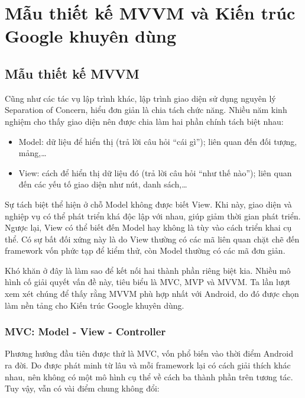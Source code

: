 \documentclass[../../thesis]{subfiles}
\begin{document}

\section{Mẫu thiết kế MVVM và Kiến trúc Google khuyên dùng}

\subsection{Mẫu thiết kế MVVM}

Cũng như các tác vụ lập trình khác, lập trình giao diện sử dụng nguyên lý
Separation of Concern, hiểu đơn giản là chia tách chức năng. Nhiều năm kinh
nghiệm cho thấy giao diện nên được chia làm hai phần chính tách biệt nhau:

\begin{itemize}
    \item
        Model: dữ liệu để hiển thị (trả lời câu hỏi ``cái gì''); liên quan đến
        đối tượng, mảng,\ldots
    \item
        View: cách để hiển thị dữ liệu đó (trả lời câu hỏi ``như thế nào'');
        liên quan đến các yếu tố giao diện như nút, danh sách,\ldots
\end{itemize}

Sự tách biệt thể hiện ở chỗ Model không được biết View. Khi này, giao diện và
nghiệp vụ có thể phát triển khá độc lập với nhau, giúp giảm thời gian phát
triển. Ngược lại, View có thể biết đến Model hay không là tùy vào cách triển
khai cụ thể. Có sự bất đối xứng này là do View thường có các mã liên quan chặt
chẽ đến framework vốn phức tạp để kiểm thử, còn Model thường có các mã đơn giản.

Khó khăn ở đây là làm sao để kết nối hai thành phần riêng biệt kia. Nhiều mô
hình cố giải quyết vấn đề này, tiêu biểu là MVC, MVP và MVVM. Ta lần lượt xem
xét chúng để thấy rằng MVVM phù hợp nhất với Android, do đó được chọn làm nền
tảng cho Kiến trúc Google khuyên dùng.

\subsubsection{MVC: Model - View - Controller}

Phương hướng đầu tiên được thử là MVC, vốn phổ biến vào thời điểm Android ra
đời. Do được phát minh từ lâu và mỗi framework lại có cách giải thích khác nhau,
nên không có một mô hình cụ thể về cách ba thành phần trên tương tác. Tuy vậy,
vẫn có vài điểm chung không đổi:
\end{document}
